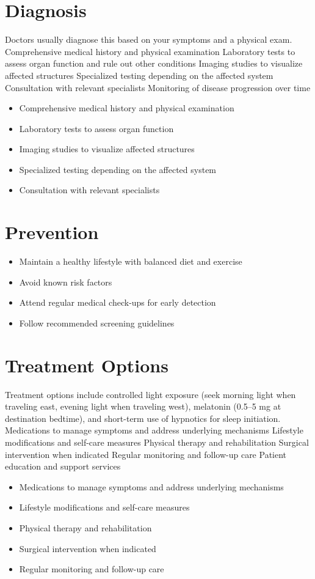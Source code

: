 \section{Diagnosis}
Doctors usually diagnose this based on your symptoms and a physical exam. Comprehensive medical history and physical examination Laboratory tests to assess organ function and rule out other conditions Imaging studies to visualize affected structures Specialized testing depending on the affected system Consultation with relevant specialists Monitoring of disease progression over time

\begin{itemize}[noitemsep]
  \item Comprehensive medical history and physical examination
  \item Laboratory tests to assess organ function
  \item Imaging studies to visualize affected structures
  \item Specialized testing depending on the affected system
  \item Consultation with relevant specialists
\end{itemize}
\section{Prevention}
\begin{itemize}[noitemsep]
  \item Maintain a healthy lifestyle with balanced diet and exercise
  \item Avoid known risk factors
  \item Attend regular medical check-ups for early detection
  \item Follow recommended screening guidelines
\end{itemize}
\section{Treatment Options}
Treatment options include controlled light exposure (seek morning light when traveling east, evening light when traveling west), melatonin (0.5--5 mg at destination bedtime), and short-term use of hypnotics for sleep initiation. Medications to manage symptoms and address underlying mechanisms Lifestyle modifications and self-care measures Physical therapy and rehabilitation Surgical intervention when indicated Regular monitoring and follow-up care Patient education and support services

\begin{itemize}[noitemsep]
  \item Medications to manage symptoms and address underlying mechanisms
  \item Lifestyle modifications and self-care measures
  \item Physical therapy and rehabilitation
  \item Surgical intervention when indicated
  \item Regular monitoring and follow-up care
\end{itemize}
